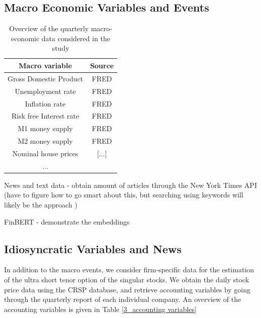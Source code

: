 \subsection{Macro Economic Variables and Events} \label{3_macro_data}
\begin{table}[]
    \centering
    \begin{tabular}{cc}
         \hline 
         Macro variable & Source \\
         \hline
         Gross Domestic Product & FRED \\
         Unemployment rate & FRED \\
         Inflation rate & FRED \\
         Risk free Interest rate & FRED \\
         M1 money supply & FRED \\
         M2 money supply & FRED \\
         Nominal house prices & [...] \\
         ... & \\
         \hline
         
    \end{tabular}
    \caption{Overview of the quarterly macro-economic data considered in the study}
    \label{3_macro_variables}
\end{table}

News and text data - obtain amount of articles through the New York Times API (have to figure how to go smart about this, but searching using keywords will likely be the approach )

FinBERT - demonstrate the embeddings

\subsection{Idiosyncratic Variables and News} \label{3_stock_data}

In addition to the macro events, we consider firm-specific data for the estimation of the ultra short tenor option of the singular stocks. We obtain the daily stock price data using the CRSP database, and retrieve accounting variables by going through the quarterly report of each individual company. An overview of the accounting variables is given in Table \ref{3_accounting variables}

